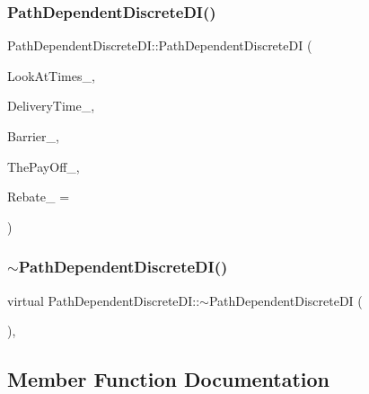 \subsubsection{\texorpdfstring{Path\+Dependent\+Discrete\+D\+I()}{PathDependentDiscreteDI()}}
{\footnotesize\ttfamily Path\+Dependent\+Discrete\+D\+I\+::\+Path\+Dependent\+Discrete\+DI (\begin{DoxyParamCaption}\item[{const \hyperlink{classMJArray}{M\+J\+Array} \&}]{Look\+At\+Times\+\_\+,  }\item[{double}]{Delivery\+Time\+\_\+,  }\item[{double}]{Barrier\+\_\+,  }\item[{const \hyperlink{classPayOffBridge}{Pay\+Off\+Bridge} \&}]{The\+Pay\+Off\+\_\+,  }\item[{double}]{Rebate\+\_\+ = {} }\end{DoxyParamCaption})}

\hypertarget{classPathDependentDiscreteDI_ab8f1cfbf5bb7e52740bcc31dc9f889f4}{}\label{classPathDependentDiscreteDI_ab8f1cfbf5bb7e52740bcc31dc9f889f4} 
\subsubsection{\texorpdfstring{$\sim$\+Path\+Dependent\+Discrete\+D\+I()}{~PathDependentDiscreteDI()}}
{\footnotesize\ttfamily virtual Path\+Dependent\+Discrete\+D\+I\+::$\sim$\+Path\+Dependent\+Discrete\+DI (\begin{DoxyParamCaption}{ }\end{DoxyParamCaption})\hspace{0.3cm}{\ttfamily [inline]}, {\ttfamily [virtual]}}



\subsection{Member Function Documentation}
\hypertarget{classPathDependentDiscreteDI_a42183f0f6276fedf39a9314009d8846c}{}\label{classPathDependentDiscreteDI_a42183f0f6276fedf39a9314009d8846c} 
